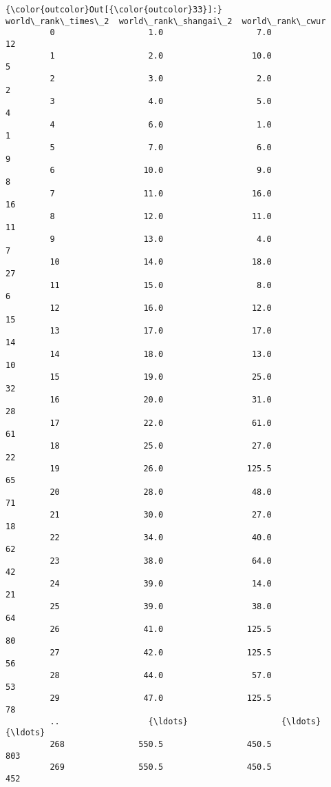 \documentclass[11pt]{article}
\begin{document}
\begin{Verbatim}[commandchars=\\\{\}]
{\color{outcolor}Out[{\color{outcolor}33}]:}      world\_rank\_times\_2  world\_rank\_shangai\_2  world\_rank\_cwur
         0                   1.0                   7.0               12
         1                   2.0                  10.0                5
         2                   3.0                   2.0                2
         3                   4.0                   5.0                4
         4                   6.0                   1.0                1
         5                   7.0                   6.0                9
         6                  10.0                   9.0                8
         7                  11.0                  16.0               16
         8                  12.0                  11.0               11
         9                  13.0                   4.0                7
         10                 14.0                  18.0               27
         11                 15.0                   8.0                6
         12                 16.0                  12.0               15
         13                 17.0                  17.0               14
         14                 18.0                  13.0               10
         15                 19.0                  25.0               32
         16                 20.0                  31.0               28
         17                 22.0                  61.0               61
         18                 25.0                  27.0               22
         19                 26.0                 125.5               65
         20                 28.0                  48.0               71
         21                 30.0                  27.0               18
         22                 34.0                  40.0               62
         23                 38.0                  64.0               42
         24                 39.0                  14.0               21
         25                 39.0                  38.0               64
         26                 41.0                 125.5               80
         27                 42.0                 125.5               56
         28                 44.0                  57.0               53
         29                 47.0                 125.5               78
         ..                  {\ldots}                   {\ldots}              {\ldots}
         268               550.5                 450.5              803
         269               550.5                 450.5              452

\end{Verbatim}
\end{document}
